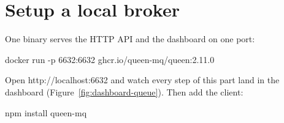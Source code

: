 
\section{Setup a local broker}


One binary serves the HTTP API and the dashboard on one port:

\begin{shell}
docker run -p 6632:6632 ghcr.io/queen-mq/queen:2.11.0
\end{shell}

Open http://localhost:6632 and watch every step of this part land in the dashboard
(Figure~\ref{fig:dashboard-queue}). Then add the client:


\begin{shell}
npm install queen-mq
\end{shell}
